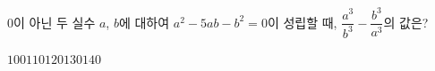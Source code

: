 \hspace*{2mm}\begin{minipage}[t]{\dimexpr\linewidth-2mm\relax}\vspace{0pt}
$0$이 아닌 두 실수 $a$, $b$에 대하여 $a^2-5ab-b^2=0$이 성립할 때, $\dfrac{a^3}{b^3}-\dfrac{b^3}{a^3}$의 값은?
\begin{choices32}{$100$}{$110$}{$120$}{$130$}{$140$}\end{choices32}\end{minipage}
